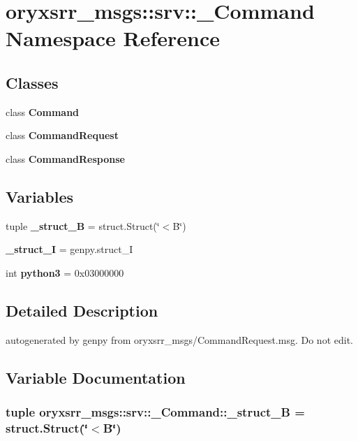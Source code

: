 \section{oryxsrr\-\_\-msgs\-:\-:srv\-:\-:\-\_\-\-Command \-Namespace \-Reference}
\label{namespaceoryxsrr__msgs_1_1srv_1_1__Command}
\subsection*{\-Classes}
\begin{DoxyCompactItemize}
\item 
class {\bf \-Command}
\item 
class {\bf \-Command\-Request}
\item 
class {\bf \-Command\-Response}
\end{DoxyCompactItemize}
\subsection*{\-Variables}
\begin{DoxyCompactItemize}
\item 
tuple {\bf \-\_\-struct\-\_\-\-B} = struct.\-Struct(\char`\"{}$<$\-B\char`\"{})
\item 
{\bf \-\_\-struct\-\_\-\-I} = genpy.\-struct\-\_\-\-I
\item 
int {\bf python3} = 0x03000000
\end{DoxyCompactItemize}


\subsection{\-Detailed \-Description}
\begin{DoxyVerb}autogenerated by genpy from oryxsrr_msgs/CommandRequest.msg. Do not edit.\end{DoxyVerb}
 

\subsection{\-Variable \-Documentation}
\subsubsection[{\-\_\-struct\-\_\-\-B}]{\setlength{\rightskip}{0pt plus 5cm}tuple {\bf oryxsrr\-\_\-msgs\-::srv\-::\-\_\-\-Command\-::\-\_\-struct\-\_\-\-B} = struct.\-Struct(\char`\"{}$<$\-B\char`\"{})}\label{namespaceoryxsrr__msgs_1_1srv_1_1__Command_a559b17c74d0a57e77d82d940ca7c659a}


